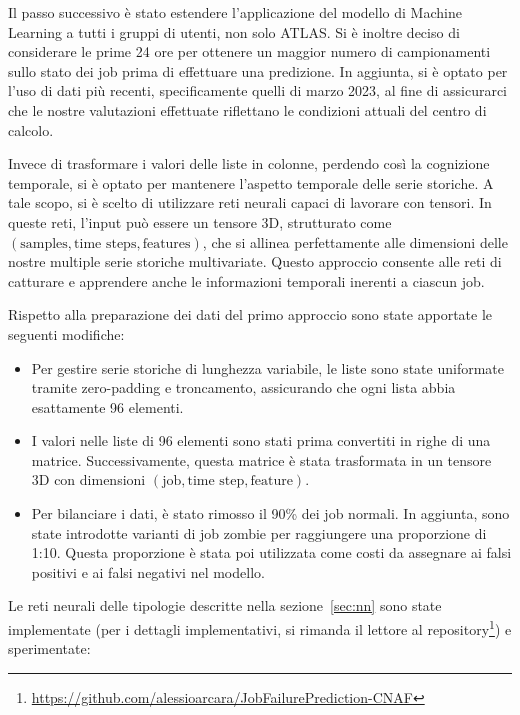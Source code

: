 Il passo successivo è stato estendere l'applicazione del modello di Machine
Learning a tutti i gruppi di utenti, non solo ATLAS. Si è inoltre deciso di
considerare le prime 24 ore per ottenere un maggior numero di campionamenti
sullo stato dei job prima di effettuare una predizione. In aggiunta, si è
optato per l'uso di dati più recenti, specificamente quelli di marzo 2023, al
fine di assicurarci che le nostre valutazioni effettuate riflettano le
condizioni attuali del centro di calcolo.

Invece di trasformare i valori delle liste in colonne, perdendo così la
cognizione temporale, si è optato per mantenere l'aspetto temporale delle
serie storiche. A tale scopo, si è scelto di utilizzare reti neurali capaci di
lavorare con tensori. In queste reti, l'input può essere un tensore 3D,
strutturato come $(\text{samples},\text{time steps},\text{features})$, che si
allinea perfettamente alle dimensioni delle nostre multiple serie storiche
multivariate. Questo approccio consente alle reti di catturare e apprendere
anche le informazioni temporali inerenti a ciascun job.

Rispetto alla preparazione dei dati del primo approccio sono state apportate
le seguenti modifiche:
\begin{itemize}
    \item Per gestire serie storiche di lunghezza variabile, le liste sono
        state uniformate tramite zero-padding e troncamento, assicurando che
        ogni lista abbia esattamente 96 elementi.
    \item I valori nelle liste di 96 elementi sono stati prima convertiti in
        righe di una matrice. Successivamente, questa matrice è stata
        trasformata in un tensore 3D con dimensioni $(\text{job},\text{time
        step},\text{feature})$.
    \item Per bilanciare i dati, è stato rimosso il 90\% dei job normali. In
        aggiunta, sono state introdotte varianti di job zombie per raggiungere
        una proporzione di 1:10. Questa proporzione è stata poi utilizzata
        come costi da assegnare ai falsi positivi e ai falsi negativi nel
        modello.
\end{itemize}

Le reti neurali delle tipologie descritte nella sezione~\ref{sec:nn} sono
state implementate (per i dettagli implementativi, si rimanda il lettore al
repository\footnote{\url{https://github.com/alessioarcara/JobFailurePrediction-CNAF}})
e sperimentate:

